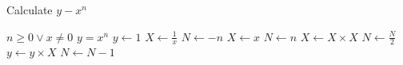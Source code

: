 \begin{algorithm}[H]
	\caption{Calculate $y - x^n$}
	\begin{algorithmic}
		\REQUIRE $n \geq 0 \vee x \neq 0$
		\ENSURE $y = x^n$
		\STATE $y \leftarrow 1$
			\STATE $X \leftarrow \frac{1}{x}$
			\STATE $N \leftarrow -n$
		\ELSE
			\STATE $X \leftarrow x$
			\STATE $N \leftarrow n$
		\ENDIF
				\STATE $X \leftarrow X \times X$
				\STATE $N \leftarrow \frac{N}{2}$
			\ELSE[$N$ is odd]
				\STATE $y \leftarrow y \times X$
				\STATE $N \leftarrow N - 1$
			\ENDIF
		\ENDWHILE
	\end{algorithmic}
\end{algorithm}